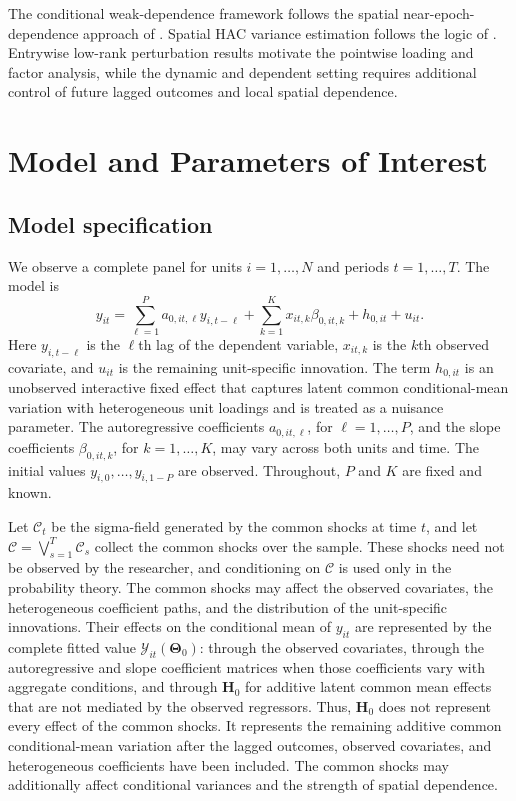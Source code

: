\documentclass[11pt]{article}
\numberwithin{equation}{section}
\theoremstyle{remark}
\newcommand{\bH}{\bm H}
\newcommand{\bTheta}{\bm\Theta}
\begin{document}
The conditional weak-dependence framework follows the spatial near-epoch-dependence approach of \citet{jenishprucha2012}. Spatial HAC variance estimation follows the logic of \citet{conley1999gmm}. Entrywise low-rank perturbation results motivate the pointwise loading and factor analysis, while the dynamic and dependent setting requires additional control of future lagged outcomes and local spatial dependence.


\section{Model and Parameters of Interest}
\label{sec:model}

\subsection{Model specification}

We observe a complete panel for units $i=1,\ldots,N$ and periods $t=1,\ldots,T$. The model is
\begin{equation}
\label{eq:model}
y_{it}
=
\sum_{\ell=1}^{P}a_{0,it,\ell}y_{i,t-\ell}
+
\sum_{k=1}^{K}x_{it,k}\beta_{0,it,k}
+
h_{0,it}
+
u_{it}.
\end{equation}
Here $y_{i,t-\ell}$ is the $\ell$th lag of the dependent variable, $x_{it,k}$ is the $k$th observed covariate, and $u_{it}$ is the remaining unit-specific innovation. The term $h_{0,it}$ is an unobserved interactive fixed effect that captures latent common conditional-mean variation with heterogeneous unit loadings and is treated as a nuisance parameter. The autoregressive coefficients $a_{0,it,\ell}$, for $\ell=1,\ldots,P$, and the slope coefficients $\beta_{0,it,k}$, for $k=1,\ldots,K$, may vary across both units and time. The initial values $y_{i,0},\ldots,y_{i,1-P}$ are observed. Throughout, $P$ and $K$ are fixed and known.

Let $\mathscr C_t$ be the sigma-field generated by the common shocks at time $t$, and let
$
\mathscr C=\bigvee_{s=1}^{T}\mathscr C_s
$
collect the common shocks over the sample. These shocks need not be observed by the researcher, and conditioning on $\mathscr C$ is used only in the probability theory. The common shocks may affect the observed covariates, the heterogeneous coefficient paths, and the distribution of the unit-specific innovations. Their effects on the conditional mean of $y_{it}$ are represented by the complete fitted value $\mathcal Y_{it}(\bTheta_0)$: through the observed covariates, through the autoregressive and slope coefficient matrices when those coefficients vary with aggregate conditions, and through $\bH_0$ for additive latent common mean effects that are not mediated by the observed regressors. Thus, $\bH_0$ does not represent every effect of the common shocks. It represents the remaining additive common conditional-mean variation after the lagged outcomes, observed covariates, and heterogeneous coefficients have been included. The common shocks may additionally affect conditional variances and the strength of spatial dependence.
\end{document}
